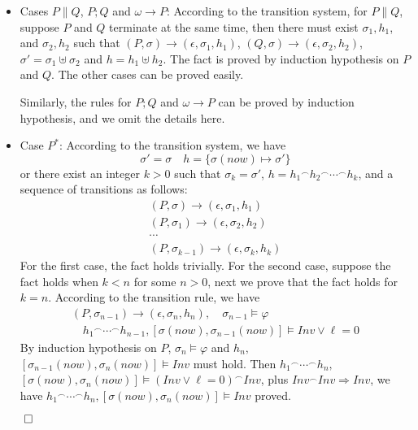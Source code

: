 \documentclass{llncs}
\newcommand{\pstop}{\epsilon}
\newcommand{\chop}{\smallfrown}
\newcommand{\Pre}{\varphi}
\begin{document}
\begin{itemize}
    \item Cases $P\|Q$, $P;Q$ and $\omega \rightarrow P$: According to the transition
    system, for $P\|Q$, suppose $P$ and $Q$ terminate at the same time, then
    there must exist $\sigma_1, h_1$,  and $\sigma_2, h_2$ such that
    $(P, \sigma) \rightarrow (\pstop, \sigma_1, h_1)$, $(Q, \sigma) \rightarrow (\pstop, \sigma_2, h_2)$,
    $\sigma' = \sigma_1 \uplus \sigma_2$ and $h = h_1 \uplus h_2$.
    The fact is proved by induction hypothesis on $P$ and $Q$.  The other cases can be proved
    easily.

    Similarly, the rules for $P;Q$ and $\omega \rightarrow P$ can be proved by induction hypothesis, and we omit
    the details here.

    \item Case $P^*$: According to the transition system,
  we have \[\sigma' = \sigma \quad h = \{\sigma(now) \mapsto \sigma'\}\]
  or there exist an integer $k>0$ such that
    $\sigma_k = \sigma'$, $h = h_1 {}^\chop h_2 {}^\chop \cdots {}^\chop h_k$, and a sequence of
    transitions as follows:
    \[
    \begin{array}{c}
      (P, \sigma) \rightarrow (\pstop, \sigma_1, h_1)\\
      (P, \sigma_1) \rightarrow (\pstop, \sigma_2, h_2)\\
      \cdots\\
      (P, \sigma_{k-1}) \rightarrow (\pstop, \sigma_k, h_k)
    \end{array}\]
    For the first case, the fact holds trivially. For the second case,
    suppose the fact holds when $k<n$ for some $n>0$, next we prove  that
    the fact holds for $k=n$. According to the transition rule,
    we have
    \[
    \begin{array}{l}
     (P, \sigma_{n-1}) \rightarrow (\pstop, \sigma_n, h_n),
      \quad \sigma_{n-1} \models\Pre\\
      \quad h_1 {}^\chop \cdots {}^\chop h_{n-1}, [\sigma(now), \sigma_{n-1}(now)]  \models Inv \vee \ell=0
    \end{array}\]
    By induction hypothesis on $P$,
    $\sigma_n \models\Pre$ and $h_n, $
    $[\sigma_{n-1}(now), \sigma_n(now)]\models Inv$ must hold. Then
    $h_1 {}^\chop \cdots {}^\chop h_n,$
    $ [\sigma(now), \sigma_n(now)] \models (Inv \vee \ell=0)^\chop Inv$, plus $Inv ^\chop Inv \Rightarrow Inv$,
    we have $h_1 {}^\chop \cdots {}^\chop h_n, [\sigma(now), \sigma_n(now)]  \models Inv$ proved.
  \end{itemize}
$\qed$
\end{document}
